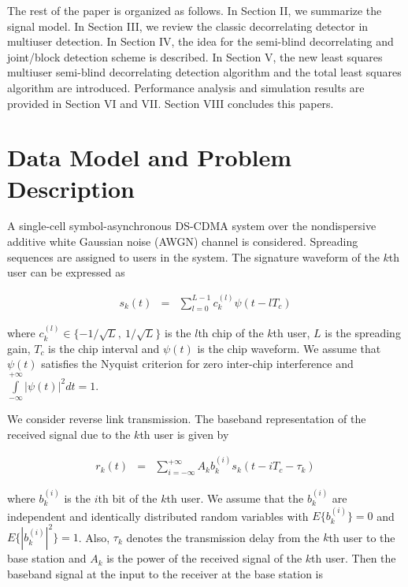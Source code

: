 \documentclass[a4paper,11pt,fleqn]{article}
\begin{document}
The rest of the paper is organized as follows. In Section II, we
summarize the signal model. In Section III, we review the classic
decorrelating detector in multiuser detection. In Section IV, the
idea for the semi-blind decorrelating and joint/block detection
scheme is described. In Section V, the new least squares multiuser
semi-blind decorrelating detection algorithm and the total least
squares algorithm are introduced. Performance analysis and
simulation results are provided in Section VI and VII. Section
VIII concludes this papers.

\section{Data Model and Problem Description}

A single-cell symbol-asynchronous DS-CDMA system over the
nondispersive additive white Gaussian noise (AWGN) channel is
considered. Spreading sequences are assigned to users in the
system. The signature waveform of the $k$th user can be expressed
as

\begin{equation}
\begin{array}{rcl}
s_k(t)&=&\sum\limits_{l=0}^{L-1}c_k^{(l)}\psi(t-lT_c)
\end{array}
\end{equation}

\noindent where $c_k^{(l)}\in \{-1/\sqrt{L},\ 1/\sqrt{L}\}$ is the
$l$th chip of the $k$th user, $L$ is the spreading gain, $T_c$ is
the chip interval and $\psi(t)$ is the chip waveform. We assume
that $\psi(t)$ satisfies the Nyquist criterion for zero inter-chip
interference and $\int\limits_{-\infty}^{+\infty}|\psi(t)|^2dt=1$.

We consider reverse link transmission. The baseband representation
of the received signal due to the $k$th user is given by

\begin{equation}
\begin{array}{rcl}
r_k(t)&=&\sum\limits_{i=-\infty}^{+\infty}A_k b_k^{(i)}
s_k(t-iT_c-\tau_k)
\end{array}
\end{equation}

where $b_k^{(i)}$ is the $i$th bit of the $k$th user. We assume
that the $b_k^{(i)}$ are independent and identically distributed
random variables with $E\{b_k^{(i)}\}=0$ and
$E\{|b_k^{(i)}|^2\}=1$. Also, $\tau_k$ denotes the transmission
delay from the $k$th user to the base station and $A_k$ is the
power of the received signal of the $k$th user. Then the baseband
signal at the input to the receiver at the base station is
\end{document}
